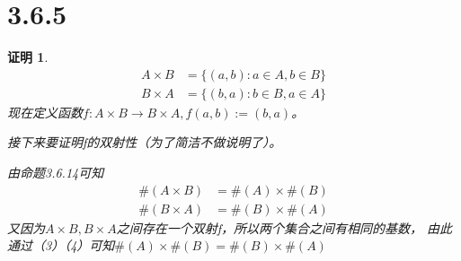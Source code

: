 \documentclass{article}
\theoremstyle{mystyle}
\theoremstyle{zproofstyle}
\newtheorem*{zproof}{证明}
\begin{document}
\section*{3.6.5}
\begin{zproof}
  \begin{align}
    A \times B & = \{(a,b): a \in A, b \in B \} \\
    B \times A & = \{(b,a): b \in B, a \in A \}
  \end{align}
  现在定义函数$f: A \times B \rightarrow B \times A, f(a, b):= (b, a)$。

  接下来要证明f的双射性（为了简洁不做说明了）。

  由命题3.6.14可知
  \begin{align}
    \#(A \times B) & = \#(A) \times \#(B) \\
    \#(B \times A) & = \#(B) \times \#(A)
  \end{align}
  又因为$A \times B, B \times A$之间存在一个双射f，所以两个集合之间有相同的基数，
  由此通过（3）（4）可知$\#(A) \times \#(B) = \#(B) \times \#(A)$
\end{zproof}
\end{document}

